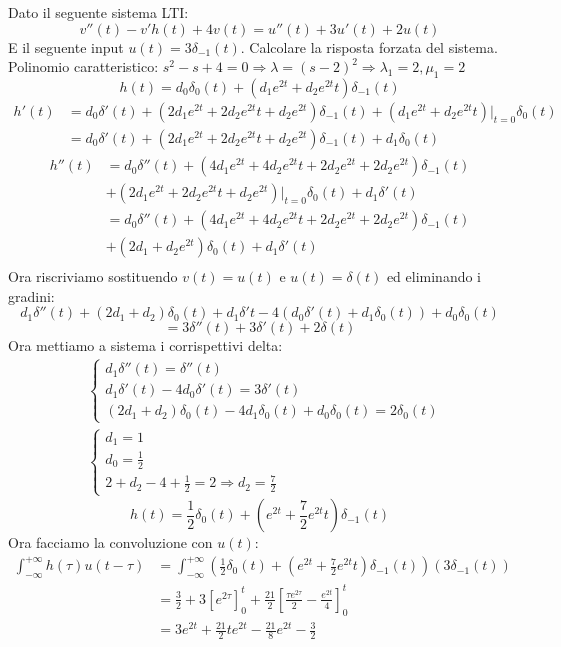 \documentclass[a4paper]{article}
\begin{document}
Dato il seguente sistema LTI:
\[v''(t) - v'h(t) + 4v(t) = u''(t) + 3u'(t) + 2u(t)\]
E il seguente input $u(t) = 3\delta_{-1}(t)$. Calcolare la risposta forzata del sistema.\\
Polinomio caratteristico: $s^2 - s + 4 = 0 \Longrightarrow \lambda = (s-2)^2 \Longrightarrow \lambda_1 = 2, \mu_1 = 2$\\
\[h(t) = d_0\delta_0(t) + (d_1e^{2t} + d_2e^{2t}t)\delta_{-1}(t)\]
\begin{align*}
    h'(t) &= d_0\delta'(t) + (2d_1e^{2t} + 2d_2e^{2t}t + d_2e^{2t})\delta_{-1}(t) + (d_1e^{2t} + d_2e^{2t}t)\bigg|_{t=0}\delta_{0}(t)\\
    &= d_0\delta'(t) + (2d_1e^{2t} + 2d_2e^{2t}t + d_2e^{2t})\delta_{-1}(t) + d_1\delta_{0}(t)
\end{align*}
\begin{align*}
    h''(t) &= d_0\delta''(t) + (4d_1e^{2t} + 4d_2e^{2t}t + 2d_2e^{2t} + 2d_2e^{2t})\delta_{-1}(t)\\
    &+ (2d_1e^{2t} + 2d_2e^{2t}t + d_2e^{2t})\bigg|_{t=0}\delta_{0}(t) + d_1\delta'(t)\\
    &= d_0\delta''(t) + (4d_1e^{2t} + 4d_2e^{2t}t + 2d_2e^{2t} + 2d_2e^{2t})\delta_{-1}(t)\\
    &+ (2d_1 + d_2e^{2t})\delta_{0}(t) + d_1\delta'(t)\\
\end{align*}
Ora riscriviamo sostituendo $v(t) = u(t)$ e $u(t) = \delta(t)$ ed eliminando i gradini:
\[d_1\delta''(t) + (2d_1 + d_2)\delta_0(t) + d_1\delta'{t} - 4(d_0\delta'(t) + d_1\delta_0(t)) + d_0\delta_0(t)\]
\[= 3\delta''(t) + 3\delta'(t) + 2\delta(t)\]
Ora mettiamo a sistema i corrispettivi delta:
\begin{align*}
&\begin{cases}
    d_1\delta''(t) = \delta''(t)\\
    d_1\delta'(t) - 4d_0\delta'(t) = 3\delta'(t)\\
    (2d_1 + d_2)\delta_0(t) - 4d_1\delta_0(t) + d_0\delta_0(t) = 2\delta_0(t)
\end{cases}\\
&\begin{cases}
    d_1 = 1\\
    d_0 = \frac{1}{2}\\
    2 + d_2 - 4 + \frac{1}{2} = 2 \Longrightarrow d_2 = \frac{7}{2}
\end{cases} 
\end{align*}
\[h(t) = \frac{1}{2}\delta_0(t) + \left(e^{2t} + \frac{7}{2}e^{2t}t\right)\delta_{-1}(t)\]
Ora facciamo la convoluzione con $u(t)$:
\begin{align*}
    \int_{-\infty}^{+\infty} h(\tau)u(t-\tau) &= \int_{-\infty}^{+\infty} \left(\frac{1}{2}\delta_0(t) + \left(e^{2t} + \frac{7}{2}e^{2t}t\right)\delta_{-1}(t)\right)(3\delta_{-1}(t)) \\
    &= \frac{3}{2} + 3\left[e^{2\tau}\right]_0^t + \frac{21}{2}\left[\frac{\tau e^{2\tau}}{2} - \frac{e^{2t}}{4}\right]_0^t\\
    &= 3e^{2t} + \frac{21}{2}te^{2t} - \frac{21}{8}e^{2t} - \frac{3}{2}\\
\end{align*}
\end{document}
